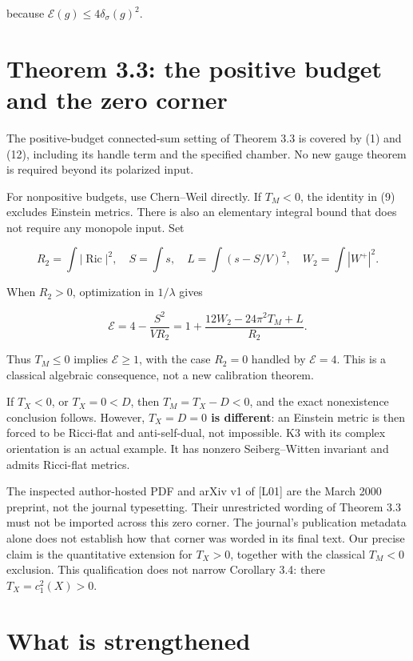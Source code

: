 \documentclass[
  11pt,
]{article}
\begin{document}
because \(\mathcal E(g)\le4\delta_\sigma(g)^2\).

\hypertarget{theorem-3.3-the-positive-budget-and-the-zero-corner}{%
\section{Theorem 3.3: the positive budget and the zero
corner}\label{theorem-3.3-the-positive-budget-and-the-zero-corner}}

The positive-budget connected-sum setting of Theorem 3.3 is covered by
(1) and (12), including its handle term and the specified chamber. No
new gauge theorem is required beyond its polarized input.

For nonpositive budgets, use Chern--Weil directly. If \(T_M<0\), the
identity in (9) excludes Einstein metrics. There is also an elementary
integral bound that does not require any monopole input. Set

\[
R_2=\int|\operatorname{Ric}|^2,\quad S=\int s,\quad
L=\int(s-S/V)^2,\quad W_2=\int|W^+|^2.
\]

When \(R_2>0\), optimization in \(1/\lambda\) gives

\[
\mathcal E=4-\frac{S^2}{VR_2}
=1+\frac{12W_2-24\pi^2T_M+L}{R_2}.                     \tag{13}
\]

Thus \(T_M\le0\) implies \(\mathcal E\ge1\), with the case \(R_2=0\)
handled by \(\mathcal E=4\). This is a classical algebraic consequence,
not a new calibration theorem.

If \(T_X<0\), or \(T_X=0<D\), then \(T_M=T_X-D<0\), and the exact
nonexistence conclusion follows. However, \textbf{\(T_X=D=0\) is
different}: an Einstein metric is then forced to be Ricci-flat and
anti-self-dual, not impossible. K3 with its complex orientation is an
actual example. It has nonzero Seiberg--Witten invariant and admits
Ricci-flat metrics.

The inspected author-hosted PDF and arXiv v1 of {[}L01{]} are the March
2000 preprint, not the journal typesetting. Their unrestricted wording
of Theorem 3.3 must not be imported across this zero corner. The
journal's publication metadata alone does not establish how that corner
was worded in its final text. Our precise claim is the quantitative
extension for \(T_X>0\), together with the classical \(T_M<0\)
exclusion. This qualification does not narrow Corollary 3.4: there
\(T_X=c_1^2(X)>0\).

\hypertarget{what-is-strengthened}{%
\section{What is strengthened}\label{what-is-strengthened}}
\end{document}
